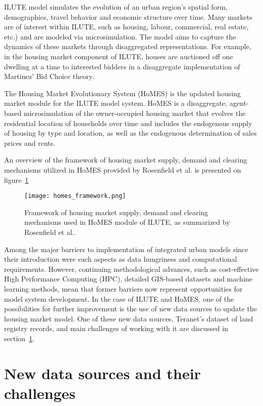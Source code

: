 ILUTE model simulates the evolution of an urban region's spatial form, demographics, travel behavior and economic structure over time.
Many markets are of interest within ILUTE, such as housing, labour, commercial, real estate, etc.) and are modeled via microsimulation.
The model aims to capture the dynamics of these markets through disaggregated representations.
For example, in the housing market component of ILUTE, houses are auctioned off one dwelling at a time to interested bidders in a disaggregate implementation of Martinez' Bid Choice theory\cite{Martinez1992}.

The Housing Market Evolutionary System (HoMES) is the updated housing market module for the ILUTE model system.
HoMES is a disaggregate, agent-based microsimulation of the owner-occupied housing market that evolves the residential location of households over time and includes the endogenous supply of housing by type and location, as well as the endogenous determination of sales prices and rents.

An overview of the framework of housing market supply, demand and clearing mechanisms utilized in HoMES provided by Rosenfield et al.\cite{Rosenfield2013} is presented on figure~\ref{fig:homes_framework}

\begin{figure}[hbt!]
    \centering
    \texttt{[image: homes\_framework.png]}
    \caption{Framework of housing market supply, demand and clearing mechanisms used in HoMES module of ILUTE, as summarized by Rosenfield et al.\cite{Rosenfield2013}.}
    \label{fig:homes_framework}
\end{figure}

Among the major barriers to implementation of integrated urban models since their introduction were such aspects as data hungriness and computational requirements\cite{Miller1998}.
However, continuing methodological advances, such as cost-effective High Performance Computing (HPC), detailed GIS-based datasets and machine learning methods, mean that former barriers now represent opportunities for model system development.
In the case of ILUTE and HoMES, one of the possibilities for further improvement is the use of new data sources to update the housing market model.
One of these new data sources, Teranet's dataset of land registry records, and main challenges of working with it are discussed in section~\ref{sec:new_data_sources_and_their_challgenges}.

\section{New data sources and their challenges} \label{sec:new_data_sources_and_their_challgenges}

